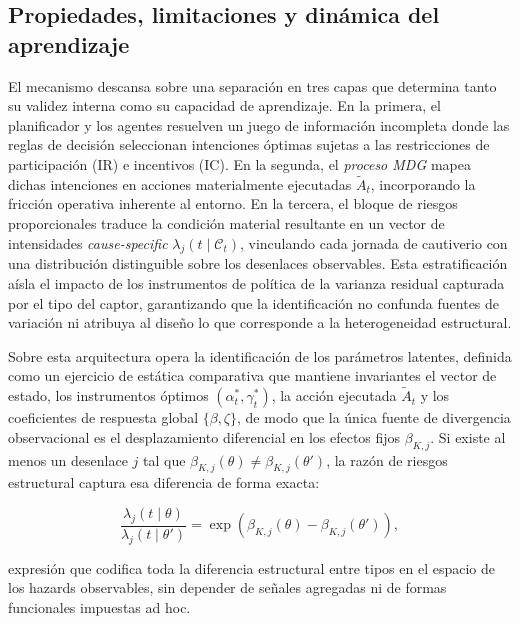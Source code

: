 \documentclass[12pt]{article}
\theoremstyle{definition}
\theoremstyle{remark}
\newcommand{\1}{\mathbf{1}}
\begin{document}

\subsection{Propiedades, limitaciones y dinámica del aprendizaje}

\noindent El mecanismo descansa sobre una separación en tres capas que determina tanto su validez interna como su capacidad de aprendizaje. En la primera, el planificador y los agentes resuelven un juego de información incompleta donde las reglas de decisión seleccionan intenciones óptimas sujetas a las restricciones de participación (IR) e incentivos (IC). En la segunda, el \textit{proceso MDG} mapea dichas intenciones en acciones materialmente ejecutadas $\tilde{A}_t$, incorporando la fricción operativa inherente al entorno. En la tercera, el bloque de riesgos proporcionales traduce la condición material resultante en un vector de intensidades \textit{cause-specific} $\lambda_j(t \mid \mathcal{C}_t)$, vinculando cada jornada de cautiverio con una distribución distinguible sobre los desenlaces observables. Esta estratificación aísla el impacto de los instrumentos de política de la varianza residual capturada por el tipo del captor, garantizando que la identificación no confunda fuentes de variación ni atribuya al diseño lo que corresponde a la heterogeneidad estructural.

\medskip

\noindent Sobre esta arquitectura opera la identificación de los parámetros latentes, definida como un ejercicio de estática comparativa que mantiene invariantes el vector de estado, los instrumentos óptimos $(\alpha_t^\ast, \gamma_t^\ast)$, la acción ejecutada $\tilde{A}_t$ y los coeficientes de respuesta global $\{\beta, \zeta\}$, de modo que la única fuente de divergencia observacional es el desplazamiento diferencial en los efectos fijos $\beta_{K,j}$. Si existe al menos un desenlace $j$ tal que $\beta_{K,j}(\theta) \neq \beta_{K,j}(\theta')$, la razón de riesgos estructural captura esa diferencia de forma exacta:

\begin{equation}
\label{eq:hazard-ratio-tipo}
\frac{\lambda_j(t \mid \theta)}{\lambda_j(t \mid \theta')} = \exp\!\left( \beta_{K,j}(\theta) - \beta_{K,j}(\theta') \right),
\end{equation}

expresión que codifica toda la diferencia estructural entre tipos en el espacio de los hazards observables, sin depender de señales agregadas ni de formas funcionales impuestas ad hoc.
\end{document}
